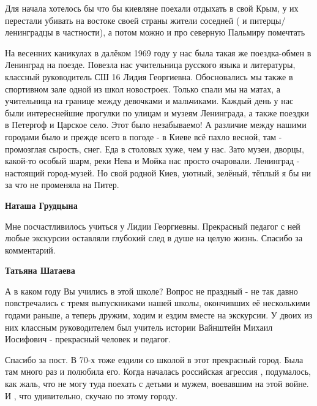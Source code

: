 \begin{itemize}
\begin{itemize}
\end{itemize} %


Для начала хотелось бы что бы киевляне поехали отдыхать в свой Крым, у их
перестали убивать на востоке своей страны жители соседней ( и
питерцы/ленинградцы в частности), а потом можно и про северную Пальмиру
помечтать


На весенних каникулах в далёком 1969 году у нас была такая же поездка-обмен в
Ленинград на поезде. Повезла нас учительница русского языка и литературы,
классный руководитель СШ 16 Лидия Георгиевна. Обосновались мы также в
спортивном зале одной из школ новостроек. Только спали мы на матах, а
учительница на границе между девочками и мальчиками. Каждый день у нас были
интереснейшие прогулки по улицам и музеям Ленинграда, а также поездки в
Петергоф и Царское село. Этот было незабываемо! А различие между нашими
городами было и прежде всего в погоде - в Киеве всё пахло весной, там -
промозглая сырость, снег. Еда в столовых хуже, чем у нас. Зато музеи, дворцы,
какой-то особый шарм, реки Нева и Мойка нас просто очаровали. Ленинград -
настоящий город-музей. Но свой родной Киев, уютный, зелёный, тёплый я бы ни за
что не променяла на Питер.

\begin{itemize} %
\textbf{Наташа Грудцына} 

Мне посчастливилось учиться у Лидии Георгиевны. Прекрасный педагог с ней любые
экскурсии оставляли глубокий след в душе на целую жизнь. Спасибо за
комментарий.

\textbf{Татьяна Шатаева} 

А в каком году Вы учились в этой школе? Вопрос не праздный - не так давно
повстречались с тремя выпускниками нашей школы, окончивших её несколькими
годами раньше, а теперь дружим, ходим и ездим вместе на экскурсии. У двоих из
них классным руководителем был учитель истории Вайнштейн Михаил Иосифович -
прекрасный человек и педагог.

\end{itemize} %


Спасибо за пост. В 70-х тоже ездили со школой в этот прекрасный город. Была там
много раз и полюбила его. Когда началась российская агрессия , подумалось, как
жаль, что не могу туда поехать с детьми и мужем, воевавшим на этой войне. И ,
что удивительно, скучаю по этому городу.


\end{itemize}
